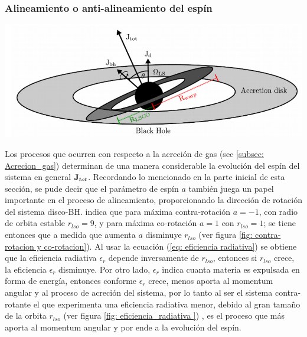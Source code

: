     \subsubsection{Alineamiento o anti-alineamiento del espín}
    \label{subsubsec: Aling_Spin}
\begin{center}
\includegraphics[scale=.4]{./figures/4_Modelo_Spin/Sistema_con_region_warp.png}
\label{fig: sistema con zona warp}
\end{center}

Los procesos que ocurren con respecto a la acreción de gas (sec \ref{subsec: Acrecion_gas}) determinan de una manera considerable la evolución del espín del sistema en general ${\bf{J}}_{tot}$. Recordando lo mencionado en la parte inicial de esta sección, se pude decir que el parámetro de espín $a$ también juega un papel importante en el proceso de alineamiento, proporcionando la dirección de rotación del sistema disco-BH. \cite{king2005} indica que para máxima contra-rotación $a=-1$, con radio de orbita estable $r_{lso}=9$, y para máxima co-rotación $a=1$ con $r_{lso}=1$; se tiene entonces que a medida que aumenta $a$ disminuye $r_{lso}$ (ver figura \ref{fig: contra-rotacion y co-rotacion}). Al usar la ecuación (\ref{eq: eficiencia radiativa}) se obtiene que la eficiencia radiativa $\epsilon_{r}$ depende inversamente de $r_{lso}$, entonces si $r_{lso}$ crece, la eficiencia $\epsilon_{r}$ disminuye. Por otro lado, $\epsilon_{r}$ indica cuanta materia es expulsada en forma de energía, entonces conforme $\epsilon_{r}$ crece, menos aporta al momentum angular y al proceso de acreción del sistema, por lo tanto al ser el sistema contra-rotante el que experimenta una eficiencia radiativa menor, debido al gran tamaño de la orbita $r_{lso}$ (ver figura \ref{fig: eficiencia_radiativa }) 
, es el proceso que más aporta al momentum angular y por ende a la evolución del espín. 

